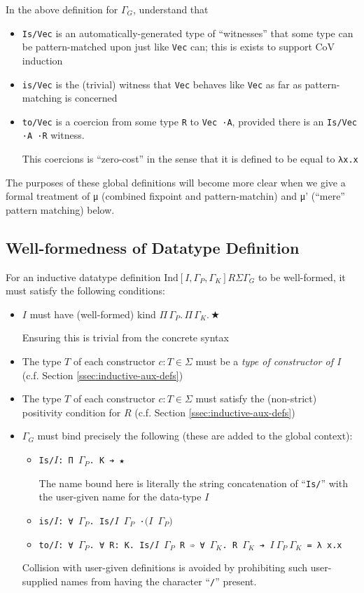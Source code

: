 \documentclass{article}
\newcommand{\ann}[2]{#1\! : \! #2}
\newcommand{\absu}[3]{{#1}\, #2.\, #3}
\newcommand{\indsche}[3]{\ensuremath{\text{Ind}[#1,#2,#3]}}
\begin{document}
\noindent In the above definition for $\Gamma_G$, understand that
\begin{itemize}
  \item \texttt{Is/Vec} is an automatically-generated type of ``witnesses''
    that some type can be pattern-matched upon just like \texttt{Vec} can; this
    is exists to support CoV induction
  \item \texttt{is/Vec} is the (trivial) witness that \texttt{Vec} behaves like
    \texttt{Vec} as far as pattern-matching is concerned
  \item \texttt{to/Vec} is a coercion from some type \texttt{R} to \texttt{Vec ·A},
    provided there is an \texttt{Is/Vec ·A ·R} witness.

    This coercions is ``zero-cost'' in the sense that it is defined to be equal
    to \texttt{λx.x}
\end{itemize}

The purposes of these global definitions will become more clear when we give a
formal treatment of μ (combined fixpoint and pattern-matchin) and μ' (``mere''
pattern matching) below.

\subsection{Well-formedness of Datatype Definition}
For an inductive datatype definition
$\indsche{I}{\Gamma_P}{\Gamma_K}{R}{\Sigma}{\Gamma_G}$ to be well-formed, it must satisfy
the following conditions:

\begin{itemize}
\item $I$ must have (well-formed) kind $\absu{\Pi}{\Gamma_P}{\absu{\Pi}{\Gamma_K}{★}}$

  Ensuring this is trivial from the concrete syntax
\item The type $T$ of each constructor $\ann{c}{T} \in \Sigma$ must be a \textit{type of
    constructor of I} (c.f. Section \ref{ssec:inductive-aux-defs})
\item The type $T$ of each constructor $\ann{c}{T} \in \Sigma$ must satisfy the (non-strict)
  positivity condition for $R$ (c.f. Section \ref{ssec:inductive-aux-defs})
\item $\Gamma_G$ must bind precisely the following (these are added to the
  global context):
  \begin{itemize}
  \item \texttt{Is/$I$: Π $\Gamma_P$. K ➔ ★}

    The name bound here is literally the string concatenation of
    ``\texttt{Is/}'' with the user-given name for the data-type $I$
  \item \texttt{is/$I$: ∀ $\Gamma_P$. Is/$I$ $\Gamma_P$ ·$(I$ $\Gamma_P)$}
  \item \texttt{to/$I$: ∀ $\Gamma_P$. ∀ R: K. Is/$I$ $\Gamma_P$ R ➾ ∀
      $\Gamma_K$. R $\Gamma_K$ ➔ $I\ \Gamma_P\ \Gamma_K$ = λ x.x}
  \end{itemize}

  Collision with user-given definitions is avoided by prohibiting such
  user-supplied names from having the character ``\texttt{/}'' present.
\end{itemize}
\end{document}
